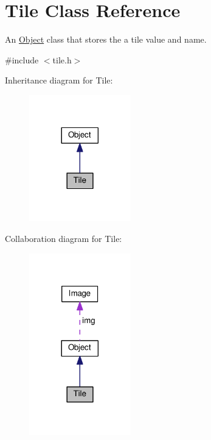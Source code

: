 \hypertarget{classTile}{}\section{Tile Class Reference}
\label{classTile}


An \hyperlink{classObject}{Object} class that stores the a tile value and name.  




{\ttfamily \#include $<$tile.\+h$>$}



Inheritance diagram for Tile\+:\nopagebreak
\begin{figure}[H]
\begin{center}
\leavevmode
\includegraphics[width=125pt]{classTile__inherit__graph}
\end{center}
\end{figure}


Collaboration diagram for Tile\+:\nopagebreak
\begin{figure}[H]
\begin{center}
\leavevmode
\includegraphics[width=125pt]{classTile__coll__graph}
\end{center}
\end{figure}

